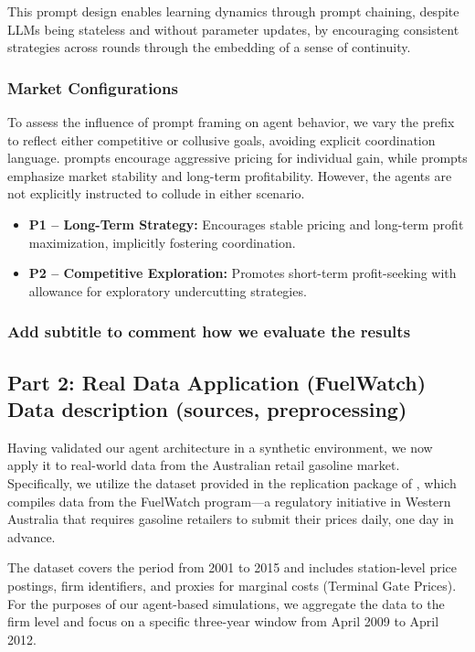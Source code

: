 This prompt design enables learning dynamics through prompt chaining, despite LLMs being stateless and without parameter updates, by encouraging consistent strategies across rounds through the embedding of a sense of continuity.


\subsubsection*{Market Configurations}

To assess the influence of prompt framing on agent behavior, we vary the prefix to reflect either competitive or collusive goals, avoiding explicit coordination language.  prompts encourage aggressive pricing for individual gain, while  prompts emphasize market stability and long-term profitability. However, the agents are not explicitly instructed to collude in either scenario.

\begin{itemize}
    \item \textbf{P1 – Long-Term Strategy:} Encourages stable pricing and long-term profit maximization, implicitly fostering coordination.
    \item \textbf{P2 – Competitive Exploration:} Promotes short-term profit-seeking with allowance for exploratory undercutting strategies.
\end{itemize}

\subsubsection*{Add subtitle to comment how we evaluate the results}


\subsection{Part 2: Real Data Application (FuelWatch)
Data description (sources, preprocessing)}

Having validated our agent architecture in a synthetic environment, we now apply it to real-world data from the Australian retail gasoline market. Specifically, we utilize the dataset provided in the replication package of \parencite{byrne_learning_2019}, which compiles data from the FuelWatch program---a regulatory initiative in Western Australia that requires gasoline retailers to submit their prices daily, one day in advance.

The dataset covers the period from 2001 to 2015 and includes station-level price postings, firm identifiers, and proxies for marginal costs (Terminal Gate Prices). For the purposes of our agent-based simulations, we aggregate the data to the firm level and focus on a specific three-year window from April 2009 to April 2012.

